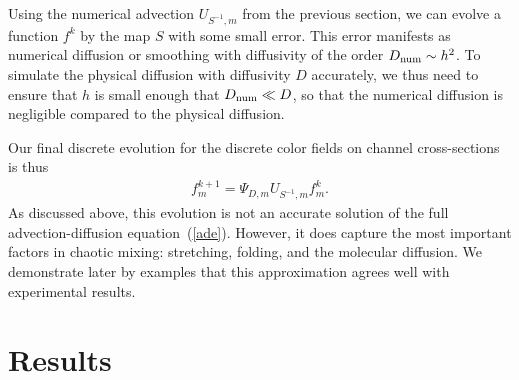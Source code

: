 \documentclass[times]{fldauth}
\begin{document}
Using the numerical advection $U_{S^{-1},m}$ from the previous
section, we can evolve a function $f^k$ by the map $S$ with some small
error. This error manifests as numerical diffusion or smoothing with
diffusivity of the order $D_{\rm num} \sim h^2$. To simulate the physical
diffusion with diffusivity $D$ accurately, we thus need to ensure that
$h$ is small enough that $D_{\rm num} \ll D$, so that the numerical
diffusion is negligible compared to the physical diffusion.

Our final discrete evolution for the discrete color fields on channel
cross-sections is thus
\begin{align}
  f^{k+1}_m = \Psi_{D,m} U_{S^{-1},m} f^k_m.
\end{align}
As discussed above, this evolution is not an accurate solution of the
full advection-diffusion equation~(\ref{ade}). However, it does
capture the most important factors in chaotic mixing: stretching,
folding, and the molecular diffusion. We demonstrate later by examples
that this approximation agrees well with experimental results.


\section{Results}
\label{sec:topoptresults}
\end{document}
